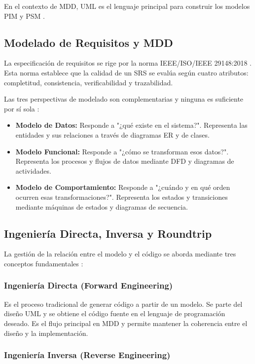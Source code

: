 \documentclass[12pt,a4paper]{article}
\begin{document}
En el contexto de MDD, UML es el lenguaje principal para construir los modelos PIM y PSM \cite{pohl2025}.

\subsection{Modelado de Requisitos y MDD}

La especificación de requisitos se rige por la norma IEEE/ISO/IEEE 29148:2018 \cite{ieee29148}. Esta norma establece que la calidad de un SRS se evalúa según cuatro atributos: completitud, consistencia, verificabilidad y trazabilidad.

Las tres perspectivas de modelado son complementarias y ninguna es suficiente por sí sola \cite{pohl2025}:

\begin{itemize}
    \item \textbf{Modelo de Datos:} Responde a "¿qué existe en el sistema?". Representa las entidades y sus relaciones a través de diagramas ER y de clases.
    \item \textbf{Modelo Funcional:} Responde a "¿cómo se transforman esos datos?". Representa los procesos y flujos de datos mediante DFD y diagramas de actividades.
    \item \textbf{Modelo de Comportamiento:} Responde a "¿cuándo y en qué orden ocurren esas transformaciones?". Representa los estados y transiciones mediante máquinas de estados y diagramas de secuencia.
\end{itemize}

\subsection{Ingeniería Directa, Inversa y Roundtrip}

La gestión de la relación entre el modelo y el código se aborda mediante tres conceptos fundamentales \cite{pohl2025}:

\subsubsection{Ingeniería Directa (Forward Engineering)}

Es el proceso tradicional de generar código a partir de un modelo. Se parte del diseño UML y se obtiene el código fuente en el lenguaje de programación deseado. Es el flujo principal en MDD y permite mantener la coherencia entre el diseño y la implementación.

\subsubsection{Ingeniería Inversa (Reverse Engineering)}
\end{document}
